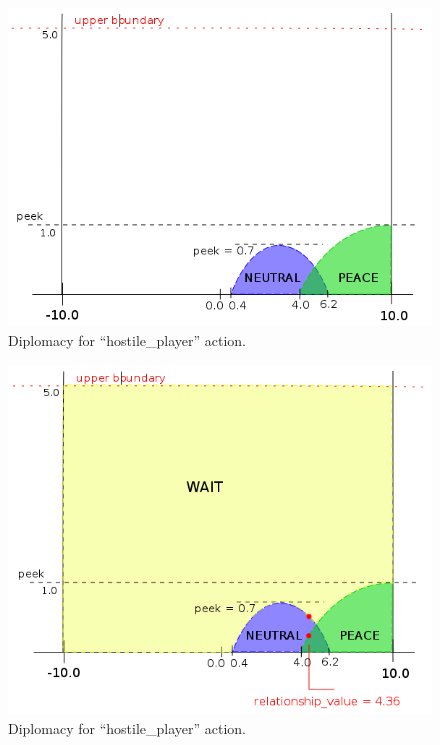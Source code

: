 \begin{figure}[h!]
	\centering
	\includegraphics[width=\textwidth]{gfx/diplomacy2.png}
	\caption{Diplomacy for ``hostile\_player'' action.}
	\label{fig:diplomacy2}
\end{figure}

\begin{figure}[h!]
	\centering
	\includegraphics[width=\textwidth]{gfx/diplomacy3.png}
	\caption{Diplomacy for ``hostile\_player'' action.}
	\label{fig:diplomacy3}
\end{figure}
